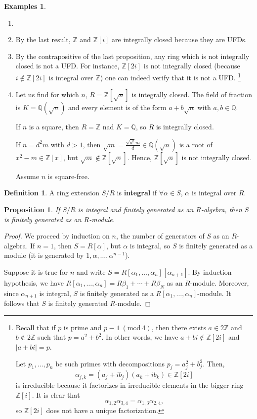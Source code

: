 \documentclass{tufte-handout} %
\newtheorem{prop}[thm]{Proposition}
\theoremstyle{definition}
\newtheorem{defn}[thm]{Definition}
\newtheorem{exmps}[thm]{Examples}
\theoremstyle{remark}
\newcommand{\Mod}[1]{\ (\text{mod}\ #1)}
\newcommand{\Z}{\mathbb{Z}}
\newcommand{\Q}{\mathbb{Q}}
\begin{document}
\begin{exmps}\label{exmpintclosed}
	\begin{enumerate}
		\item[]
		\item By the last result, $\Z$ and $\Z[i]$ are integrally closed because they are UFDs.
		\item By the contrapositive of the last proposition, any ring which is not integrally closed is not a UFD. For instance, $\Z[2i]$ is not integrally closed (because $i\notin \Z[2i]$ is integral over $\Z$) one can indeed verify that it is not a UFD.
		\footnote{Recall that if $p$ is prime and $p \equiv 1 \Mod{4}$, then there exists $a \in 2\Z$ and $b \notin 2\Z$ such that $p = a^2+b^2$. In other words, we have $a+bi \notin \Z[2i]$ and $|a+bi| = p$.
			
		Let $p_1, \dots, p_n$ be such primes with decompositions $p_j = a_j^2 + b_j^2$. Then, $$\alpha_{j,k} = (a_j+ib_j)(a_k+ib_k) \in \Z[2i]$$ is irreducible  because it factorizes in irreducible elements in the bigger ring $\Z[i]$. It is clear that $$\alpha_{1,2}\alpha_{3,4} = \alpha_{1,3}\alpha_{2,4},$$ so $\Z[2i]$ does not have a unique factorization.}
		
		\item Let us find for which $n$,  $R = \Z[\sqrt{n}]$ is integrally closed. The field of fraction is $K = \Q(\sqrt{n})$ and every element is of the form $a+b\sqrt{n}$ with $a,b \in \Q$. 
		
		If $n$ is a square, then $R= \Z$ nad $K = \Q$, so $R$ is integrally closed.
		
		If $n= d^2m$ with $d > 1$, then $\sqrt{m} = \frac{\sqrt{d^2}m}{d} \in \Q(\sqrt{n})$ is a root of $x^2-m \in \Z[x]$, but $\sqrt{m} \notin \Z[\sqrt{n}]$. Hence, $\Z[\sqrt{n}]$ is not integrally closed.
		
		Assume $n$ is square-free. %
	\end{enumerate}
\end{exmps}
\begin{defn}
	A ring extension $S/R$ is \textbf{integral} if $\forall \alpha \in S$, $\alpha$ is integral over $R$.
\end{defn}
\begin{prop}
	If $S/R$ is integral and finitely generated as an $R$-algebra, then $S$ is finitely generated as an $R$-module.
\end{prop}
\begin{proof}
	We proceed by induction on $n$, the number of generators of $S$ as an $R$-algebra. If $n=1$, then $S= R[\alpha]$, but $\alpha$ is integral, so $S$ is finitely generated as a module (it is generated by $1,\alpha, \dots, \alpha^{n-1}$).
	
	Suppose it is true for $n$ and write $S = R[\alpha_1, \dots, \alpha_n][\alpha_{n+1}]$. By induction hypothesis, we have $R[\alpha_1, \dots, \alpha_n] = R\beta_1 + \cdots + R\beta_N$ as an $R$-module. Moreover, since $\alpha_{n+1}$ is integral, $S$ is finitely generated as a $R[\alpha_1, \dots, \alpha_n]$-module. It follows that $S$ is finitely generated $R$-module.
\end{proof}
\end{document}
